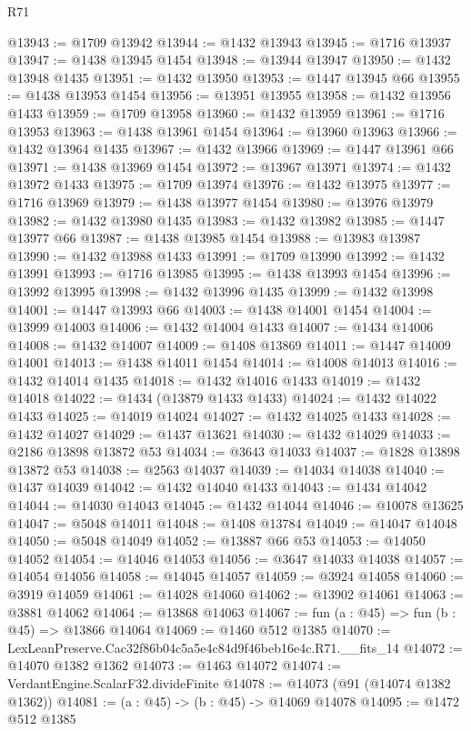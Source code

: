 \begin{lexlean}{R71}
\begin{coremodule}
@13943 := @1709 @13942
@13944 := @1432 @13943
@13945 := @1716 @13937
@13947 := @1438 @13945 @1454
@13948 := @13944 @13947
@13950 := @1432 @13948 @1435
@13951 := @1432 @13950
@13953 := @1447 @13945 @66
@13955 := @1438 @13953 @1454
@13956 := @13951 @13955
@13958 := @1432 @13956 @1433
@13959 := @1709 @13958
@13960 := @1432 @13959
@13961 := @1716 @13953
@13963 := @1438 @13961 @1454
@13964 := @13960 @13963
@13966 := @1432 @13964 @1435
@13967 := @1432 @13966
@13969 := @1447 @13961 @66
@13971 := @1438 @13969 @1454
@13972 := @13967 @13971
@13974 := @1432 @13972 @1433
@13975 := @1709 @13974
@13976 := @1432 @13975
@13977 := @1716 @13969
@13979 := @1438 @13977 @1454
@13980 := @13976 @13979
@13982 := @1432 @13980 @1435
@13983 := @1432 @13982
@13985 := @1447 @13977 @66
@13987 := @1438 @13985 @1454
@13988 := @13983 @13987
@13990 := @1432 @13988 @1433
@13991 := @1709 @13990
@13992 := @1432 @13991
@13993 := @1716 @13985
@13995 := @1438 @13993 @1454
@13996 := @13992 @13995
@13998 := @1432 @13996 @1435
@13999 := @1432 @13998
@14001 := @1447 @13993 @66
@14003 := @1438 @14001 @1454
@14004 := @13999 @14003
@14006 := @1432 @14004 @1433
@14007 := @1434 @14006
@14008 := @1432 @14007
@14009 := @1408 @13869
@14011 := @1447 @14009 @14001
@14013 := @1438 @14011 @1454
@14014 := @14008 @14013
@14016 := @1432 @14014 @1435
@14018 := @1432 @14016 @1433
@14019 := @1432 @14018
@14022 := @1434 (@13879 @1433 @1433)
@14024 := @1432 @14022 @1433
@14025 := @14019 @14024
@14027 := @1432 @14025 @1433
@14028 := @1432 @14027
@14029 := @1437 @13621
@14030 := @1432 @14029
@14033 := @2186 @13898 @13872 @53
@14034 := @3643 @14033
@14037 := @1828 @13898 @13872 @53
@14038 := @2563 @14037
@14039 := @14034 @14038
@14040 := @1437 @14039
@14042 := @1432 @14040 @1433
@14043 := @1434 @14042
@14044 := @14030 @14043
@14045 := @1432 @14044
@14046 := @10078 @13625
@14047 := @5048 @14011
@14048 := @1408 @13784
@14049 := @14047 @14048
@14050 := @5048 @14049
@14052 := @13887 @66 @53
@14053 := @14050 @14052
@14054 := @14046 @14053
@14056 := @3647 @14033 @14038
@14057 := @14054 @14056
@14058 := @14045 @14057
@14059 := @3924 @14058
@14060 := @3919 @14059
@14061 := @14028 @14060
@14062 := @13902 @14061
@14063 := @3881 @14062
@14064 := @13868 @14063
@14067 := fun (a : @45) => fun (b : @45) => @13866 @14064
@14069 := @1460 @512 @1385
@14070 := LexLeanPreserve.Cac32f86b04c5a5e4c84d9f46beb16e4c.R71.__fits_14
@14072 := @14070 @1382 @1362
@14073 := @1463 @14072
@14074 := VerdantEngine.ScalarF32.divideFinite
@14078 := @14073 (@91 (@14074 @1382 @1362))
@14081 := (a : @45) -> (b : @45) -> @14069 @14078
@14095 := @1472
    @512
    @1385

\end{coremodule}
\end{lexlean}

